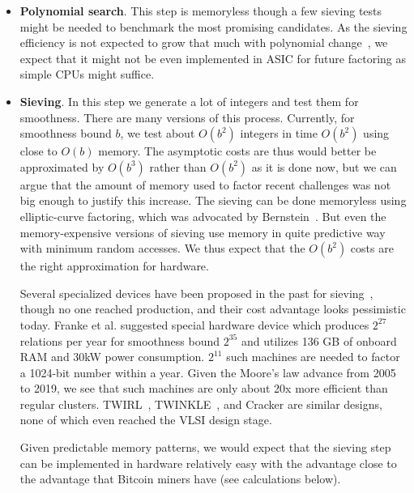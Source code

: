 \documentclass[a4paper]{article}
\begin{document}
 \begin{itemize}
    \item \textbf{Polynomial search}.  This step is memoryless though a few sieving tests might be needed to benchmark the most promising candidates. As the sieving efficiency is not expected to grow that much with polynomial change~\cite{kleinjung2006polynomial}, we expect that it might not be even implemented in ASIC for future factoring as simple CPUs might suffice.
 
     \item \textbf{Sieving}. In this step we generate a lot of integers and test them for smoothness.  There are many versions of this process. Currently, for smoothness bound $b$, we test about $O(b^2)$ integers in time $O(b^2)$ using close to $O(b)$ memory. The asymptotic costs are thus would better be approximated by $O(b^3)$ rather than $O(b^2)$ as it is done now, but we can argue that the amount of memory used to factor recent challenges was not big enough to justify this increase. The sieving  can be done memoryless using elliptic-curve factoring, which was advocated by Bernstein~\cite{bernstein01}. But even
     the memory-expensive versions of sieving use memory in quite predictive way with minimum random accesses. We thus expect that the $O(b^2)$ costs are the right approximation for hardware.
     
     Several specialized devices have been proposed in the past for sieving~\cite{DBLP:conf/ches/Shamir99,pelzl2005area,bachimanchi2007fpga,izu2007cairn}, though no one reached production, and their cost advantage looks pessimistic today. Franke et al. suggested \cite{DBLP:conf/ches/FrankeKPPPS05} special hardware device which produces $2^{27}$ relations per year for smoothness bound $2^{35}$ and utilizes 136 GB of onboard RAM and 30kW power consumption. $2^{11}$ such machines are needed to factor a 1024-bit number within a year. Given the Moore's law advance from 2005 to 2019, we see that such machines are only about 20x more efficient than regular clusters. TWIRL~\cite{shamir2003factoring}, TWINKLE~\cite{DBLP:conf/ches/Shamir99}, and Cracker are similar designs, none of which even reached the VLSI design stage.
     
     Given predictable memory patterns, we would expect that the sieving step can be implemented in hardware relatively easy with the advantage close to the advantage that Bitcoin miners have (see calculations below).
     

\end{itemize}
\end{document}

